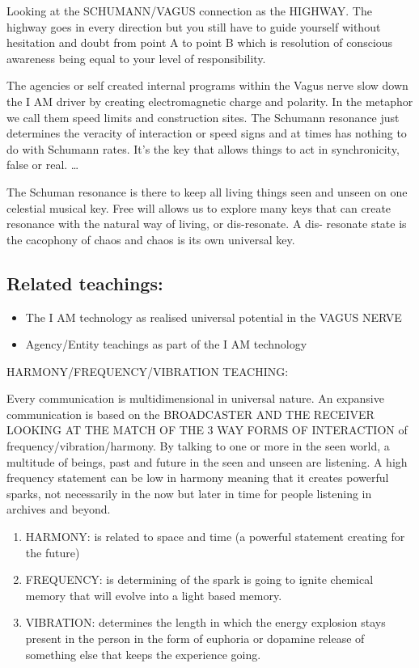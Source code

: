 Looking at the SCHUMANN/VAGUS connection as the HIGHWAY. The highway
goes in every direction but you still have to guide yourself without
hesitation and doubt from point A to point B which is resolution of
conscious awareness being equal to your level of responsibility.

The agencies or self created internal programs within the Vagus nerve
slow down the I AM driver by creating electromagnetic charge and
polarity. In the metaphor we call them speed limits and construction
sites. The Schumann resonance just determines the veracity of
interaction or speed signs and at times has nothing to do with Schumann
rates. It's the key that allows things to act in synchronicity, false or
real. \ldots{}

The Schuman resonance is there to keep all living things seen and unseen
on one celestial musical key. Free will allows us to explore many keys
that can create resonance with the natural way of living, or
dis-resonate. A dis- resonate state is the cacophony of chaos and chaos
is its own universal key.

\subsection{Related teachings:}\label{related-teachings-4}

\begin{itemize}
\item
  The I AM technology as realised universal potential in the VAGUS NERVE
\item
  Agency/Entity teachings as part of the I AM technology
\end{itemize}

HARMONY/FREQUENCY/VIBRATION TEACHING:

Every communication is multidimensional in universal nature. An
expansive communication is based on the BROADCASTER AND THE RECEIVER
LOOKING AT THE MATCH OF THE 3 WAY FORMS OF INTERACTION of
frequency/vibration/harmony. By talking to one or more in the seen
world, a multitude of beings, past and future in the seen and unseen are
listening. A high frequency statement can be low in harmony meaning that
it creates powerful sparks, not necessarily in the now but later in time
for people listening in archives and beyond.

\begin{enumerate}
\def\labelenumi{\arabic{enumi}.}
\item
  HARMONY: is related to space and time (a powerful statement creating
  for the future)
\item
  FREQUENCY: is determining of the spark is going to ignite chemical
  memory that will evolve into a light based memory.
\item
  VIBRATION: determines the length in which the energy explosion stays
  present in the person in the form of euphoria or dopamine release of
  something else that keeps the experience going.
\end{enumerate}

